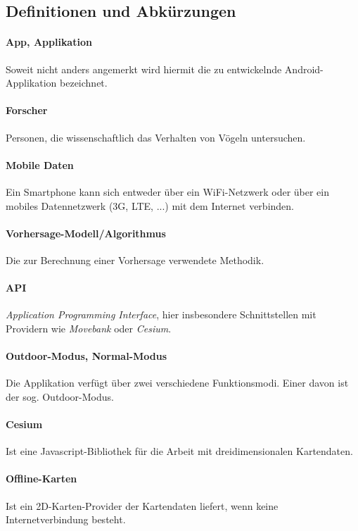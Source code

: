 \documentclass[12pt]{article} %
\begin{document}


\subsection{Definitionen und Abkürzungen}

	\paragraph{App, Applikation} Soweit nicht anders angemerkt wird hiermit die zu entwickelnde Android-Applikation bezeichnet.
	 \paragraph{Forscher} Personen, die wissenschaftlich das Verhalten von Vögeln untersuchen.
	 \paragraph{Mobile Daten} Ein Smartphone kann sich entweder über ein WiFi-Netzwerk oder über ein mobiles Datennetzwerk (3G, LTE, ...) mit dem Internet verbinden. 
	\paragraph{Vorhersage-Modell/Algorithmus} Die zur Berechnung einer Vorhersage verwendete Methodik. 
	\paragraph{API} \textit{Application Programming Interface}, hier insbesondere Schnittstellen mit Providern wie \textit{Movebank} oder \textit{Cesium}. 
	\paragraph{Outdoor-Modus, Normal-Modus} Die Applikation verfügt über zwei verschiedene Funktionsmodi. Einer davon ist der sog. Outdoor-Modus.
	\paragraph{Cesium} Ist eine Javascript-Bibliothek für die Arbeit mit dreidimensionalen Kartendaten.
	\paragraph{Offline-Karten} Ist ein 2D-Karten-Provider der Kartendaten liefert, wenn keine Internetverbindung besteht.
\end{document}
